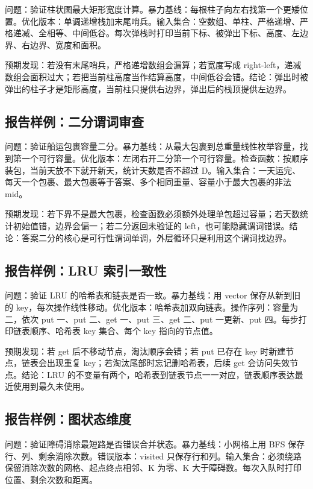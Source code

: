 问题：验证柱状图最大矩形宽度计算。暴力基线：每根柱子向左右找第一个更矮位置。优化版本：单调递增栈加末尾哨兵。输入集合：空数组、单柱、严格递增、严格递减、全相等、中间低谷。每次弹栈时打印当前下标、被弹出下标、高度、左边界、右边界、宽度和面积。

预期发现：若没有末尾哨兵，严格递增数组会漏算；若宽度写成 right-left，递减数组会面积过大；若把当前柱高度当作结算高度，中间低谷会错。结论：弹出时被弹出的柱子才是矩形高度，当前柱只提供右边界，弹出后的栈顶提供左边界。

\subsection{报告样例：二分谓词审查}

问题：验证船运包裹容量二分。暴力基线：从最大包裹到总重量线性枚举容量，找到第一个可行容量。优化版本：左闭右开二分第一个可行容量。检查函数：按顺序装包，当前天放不下就开新天，统计天数是否不超过 D。输入集合：一天运完、每天一个包裹、最大包裹等于答案、多个相同重量、容量小于最大包裹的非法 mid。

预期发现：若下界不是最大包裹，检查函数必须额外处理单包超过容量；若天数统计初始值错，边界会偏一；若二分返回未验证的 left，也可能隐藏谓词错误。结论：答案二分的核心是可行性谓词单调，外层循环只是利用这个谓词找边界。

\subsection{报告样例：LRU 索引一致性}

问题：验证 LRU 的哈希表和链表是否一致。暴力基线：用 vector 保存从新到旧的 key，每次操作线性移动。优化版本：哈希表加双向链表。操作序列：容量为二，依次 put 一、put 二、get 一、put 三、get 二、put 一更新、put 四。每步打印链表顺序、哈希表 key 集合、每个 key 指向的节点值。

预期发现：若 get 后不移动节点，淘汰顺序会错；若 put 已存在 key 时新建节点，链表会出现重复 key；若淘汰尾部时忘记删哈希表，后续 get 会访问失效节点。结论：LRU 的不变量有两个，哈希表到链表节点一一对应，链表顺序表达最近使用到最久未使用。

\subsection{报告样例：图状态维度}

问题：验证障碍消除最短路是否错误合并状态。暴力基线：小网格上用 BFS 保存行、列、剩余消除次数。错误版本：visited 只保存行和列。输入集合：必须绕路保留消除次数的网格、起点终点相邻、K 为零、K 大于障碍数。每次入队时打印位置、剩余次数和距离。

